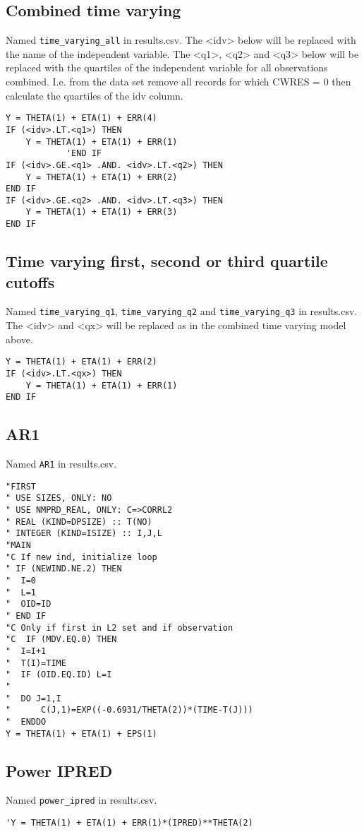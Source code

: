 \subsection{Combined time varying}
Named \verb|time_varying_all| in results.csv. The <idv> below will be replaced with the name of the independent variable. The <q1>, <q2> and <q3> below will be replaced with the quartiles of the independent variable
for all observations combined. I.e. from the data set remove all records for which CWRES = 0 then calculate the quartiles of the idv column.
\begin{verbatim}
Y = THETA(1) + ETA(1) + ERR(4)
IF (<idv>.LT.<q1>) THEN
    Y = THETA(1) + ETA(1) + ERR(1)
            'END IF
IF (<idv>.GE.<q1> .AND. <idv>.LT.<q2>) THEN
    Y = THETA(1) + ETA(1) + ERR(2)
END IF
IF (<idv>.GE.<q2> .AND. <idv>.LT.<q3>) THEN
    Y = THETA(1) + ETA(1) + ERR(3)
END IF
\end{verbatim}

\subsection{Time varying first, second or third quartile cutoffs}
Named \verb|time_varying_q1|, \verb|time_varying_q2| and \verb|time_varying_q3| in results.csv. The <idv> and <qx> will be replaced as in the combined time varying model above.
\begin{verbatim}
Y = THETA(1) + ETA(1) + ERR(2)
IF (<idv>.LT.<qx>) THEN
    Y = THETA(1) + ETA(1) + ERR(1)
END IF
\end{verbatim}

\subsection{AR1}
Named \verb|AR1| in results.csv.
\begin{verbatim}
"FIRST
" USE SIZES, ONLY: NO
" USE NMPRD_REAL, ONLY: C=>CORRL2
" REAL (KIND=DPSIZE) :: T(NO)
" INTEGER (KIND=ISIZE) :: I,J,L
"MAIN
"C If new ind, initialize loop
" IF (NEWIND.NE.2) THEN
"  I=0
"  L=1
"  OID=ID
" END IF
"C Only if first in L2 set and if observation
"C  IF (MDV.EQ.0) THEN
"  I=I+1
"  T(I)=TIME
"  IF (OID.EQ.ID) L=I
"
"  DO J=1,I
"      C(J,1)=EXP((-0.6931/THETA(2))*(TIME-T(J)))
"  ENDDO
Y = THETA(1) + ETA(1) + EPS(1)
\end{verbatim}

\subsection{Power IPRED}
Named \verb|power_ipred| in results.csv.
\begin{verbatim}
'Y = THETA(1) + ETA(1) + ERR(1)*(IPRED)**THETA(2)
\end{verbatim}

